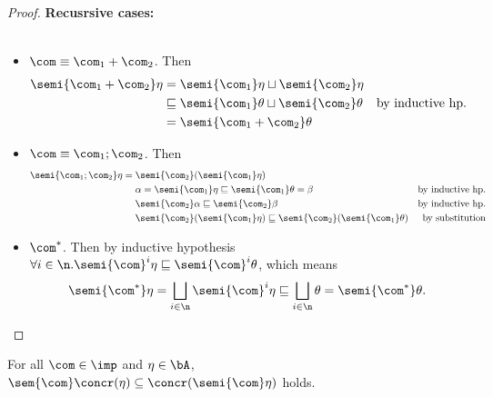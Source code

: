 \begin{proof}
  \noindent
  \textbf{Recusrsive cases:}\ \\ \
  \begin{itemize}
  \item \(\com \equiv \com_1 + \com_2\). Then
    \begin{align*}
      \semi{\com_1 + \com_2}\eta & = \semi{\com_1}\eta \sqcup \semi{\com_2}\eta & \\
      & \sqsubseteq \semi{\com_1}\theta \sqcup \semi{\com_2}\theta & \text{by inductive hp.} \\
      & = \semi{\com_1 + \com_2}\theta
    \end{align*}
  \item \(\com \equiv \com_1 ; \com_2\). Then
    \begin{align*}
      \semi{\com_1;\com_2}\eta = \; & \semi{\com_2}(\semi{\com_1}\eta) & \\
      & \alpha = \semi{\com_1}\eta \sqsubseteq \semi{\com_1}\theta = \beta & \text{by inductive hp.} \\
      & \semi{\com_2}\alpha \sqsubseteq \semi{\com_2}\beta & \text{by inductive hp.} \\
      & \semi{\com_2}(\semi{\com_1}\eta) \sqsubseteq \semi{\com_2}(\semi{\com_1}\theta) & \text{by substitution}
    \end{align*}
  \item \(\com^*\). Then by inductive hypothesis \(\forall i \in \n
    . \semi{\com}^i\eta \sqsubseteq \semi{\com}^i\theta\), which means
    \[\semi{\com^*}\eta = \bigsqcup_{i\in\n}\semi{\com}^i\eta \sqsubseteq
    \bigsqcup_{i\in\n}\theta = \semi{\com^*}\theta.\]
  \end{itemize}
\end{proof}

\begin{theorem}
  For all \(\com \in \imp\) and \(\eta\in \bA\),
  \(\sem{\com}\concr(\eta) \subseteq \concr(\semi{\com}\eta)\) holds.
\end{theorem}

